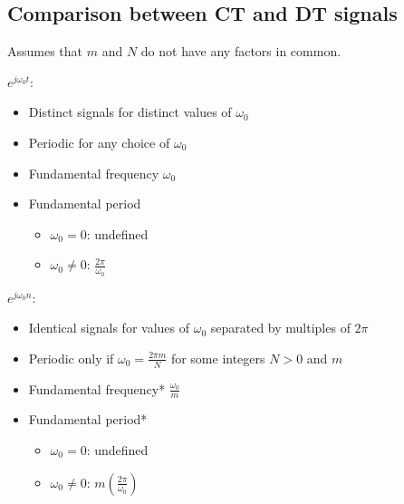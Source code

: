 \subsection{Comparison between CT and DT signals}
\begin{intuition}   
    Assumes that $m$ and $N$ do not have any factors in common. 

    $e^{j \omega_0 t}$: 
    \begin{itemize}
        \item Distinct signals for distinct values of $\omega_0$
        \item Periodic for any choice of $\omega_0$
        \item Fundamental frequency $\omega_0$
        \item Fundamental period
        \begin{itemize}
            \item $\omega_0 = 0$: undefined
            \item $\omega_0 \neq 0$: $\frac{2\pi}{\omega_0}$
        \end{itemize}
    \end{itemize}
    \vspace{1em}

    $e^{j \omega_0 n}$:
    \begin{itemize}
        \item Identical signals for values of $\omega_0$ separated by multiples of $2\pi$
        \item Periodic only if $\omega_0 = \frac{2\pi m}{N}$ for some integers $N > 0$ and $m$
        \item Fundamental frequency* $\frac{\omega_0}{m}$
        \item Fundamental period*
        \begin{itemize}
            \item $\omega_0 = 0$: undefined
            \item $\omega_0 \neq 0$: $m\left(\frac{2\pi}{\omega_0}\right)$
        \end{itemize}
    \end{itemize}    
\end{intuition}